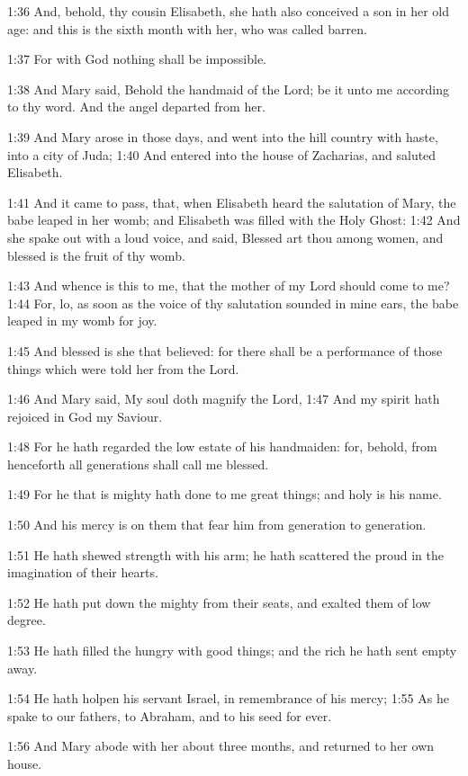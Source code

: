 1:36 And, behold, thy cousin Elisabeth, she hath also conceived a son
in her old age: and this is the sixth month with her, who was called
barren.

1:37 For with God nothing shall be impossible.

1:38 And Mary said, Behold the handmaid of the Lord; be it unto me
according to thy word. And the angel departed from her.

1:39 And Mary arose in those days, and went into the hill country with
haste, into a city of Juda; 1:40 And entered into the house of
Zacharias, and saluted Elisabeth.

1:41 And it came to pass, that, when Elisabeth heard the salutation of
Mary, the babe leaped in her womb; and Elisabeth was filled with the
Holy Ghost: 1:42 And she spake out with a loud voice, and said,
Blessed art thou among women, and blessed is the fruit of thy womb.

1:43 And whence is this to me, that the mother of my Lord should come
to me?  1:44 For, lo, as soon as the voice of thy salutation sounded
in mine ears, the babe leaped in my womb for joy.

1:45 And blessed is she that believed: for there shall be a
performance of those things which were told her from the Lord.

1:46 And Mary said, My soul doth magnify the Lord, 1:47 And my spirit
hath rejoiced in God my Saviour.

1:48 For he hath regarded the low estate of his handmaiden: for,
behold, from henceforth all generations shall call me blessed.

1:49 For he that is mighty hath done to me great things; and holy is
his name.

1:50 And his mercy is on them that fear him from generation to
generation.

1:51 He hath shewed strength with his arm; he hath scattered the proud
in the imagination of their hearts.

1:52 He hath put down the mighty from their seats, and exalted them of
low degree.

1:53 He hath filled the hungry with good things; and the rich he hath
sent empty away.

1:54 He hath holpen his servant Israel, in remembrance of his mercy;
1:55 As he spake to our fathers, to Abraham, and to his seed for ever.

1:56 And Mary abode with her about three months, and returned to her
own house.

